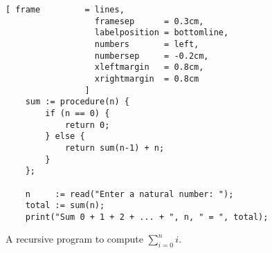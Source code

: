 \begin{figure}[!ht]
  \centering
\begin{Verbatim}[ frame         = lines, 
                  framesep      = 0.3cm, 
                  labelposition = bottomline,
                  numbers       = left,
                  numbersep     = -0.2cm,
                  xleftmargin   = 0.8cm,
                  xrightmargin  = 0.8cm
                ]
    sum := procedure(n) {
        if (n == 0) { 
            return 0;
        } else {
            return sum(n-1) + n;
        }
    };
    
    n     := read("Enter a natural number: "); 
    total := sum(n);
    print("Sum 0 + 1 + 2 + ... + ", n, " = ", total);
\end{Verbatim} 
\vspace*{-0.3cm}
  \caption{A recursive program to compute $\sum\limits_{i=0}^ni$.}
  \label{fig:sum-recursive.stlx}
\end{figure} 


